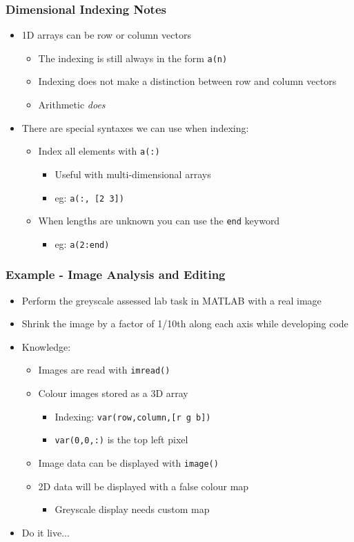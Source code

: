 \documentclass[14pt]{beamer}
\begin{document}
\begin{frame}
\frametitle{Dimensional Indexing Notes}
\begin{itemize}
\item 1D arrays can be row or column vectors
	\begin{itemize}
		\item The indexing is still always in the form \texttt{a(n)}
		\item Indexing does not make a distinction between row and column vectors
		\item Arithmetic \textit{does}
	\end{itemize}
\pause
\item There are special syntaxes we can use when indexing:
	\begin{itemize}
		\item Index all elements with \texttt{a(:)}
			\begin{itemize}
				\item Useful with multi-dimensional arrays
				\item eg: \texttt{a(:, [2 3])}
			\end{itemize}
		\item When lengths are unknown you can use the \texttt{end} keyword
			\begin{itemize}
				\item eg: \texttt{a(2:end)}
			\end{itemize}
	\end{itemize}
\end{itemize}
\end{frame}

\begin{frame}
\frametitle{Example - Image Analysis and Editing}
\begin{itemize}
\item Perform the greyscale assessed lab task in MATLAB with a real image
\item Shrink the image by a factor of 1/10th along each axis while developing code
\item Knowledge:
	\begin{itemize}
		\item Images are read with \texttt{imread()}
		\item Colour images stored as a 3D array
			\begin{itemize}
				\item Indexing: \texttt{var(row,column,[r g b])}
				\item \texttt{var(0,0,:)} is the top left pixel
			\end{itemize}
		\item Image data can be displayed with \texttt{image()}
		\item 2D data will be displayed with a false colour map
			\begin{itemize}
				\item Greyscale display needs custom map
			\end{itemize}
	\end{itemize}

\item Do it live...
\end{itemize}
\end{frame}
\end{document}
